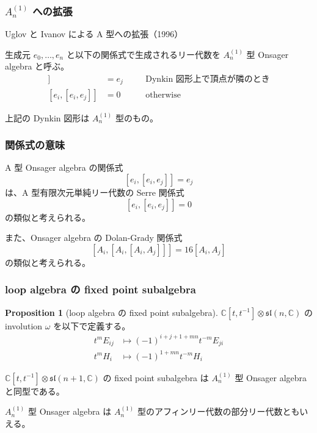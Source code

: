 \documentclass{beamer}
\theoremstyle{definition}
\newtheorem{proposition}{Proposition}
\begin{document}
\begin{frame}
    \frametitle{\(A_n^{(1)}\) への拡張}

    Uglov と Ivanov による A 型への拡張（1996）

    \begin{definition}
        生成元 \(e_0, \dots, e_n\) と以下の関係式で生成されるリー代数を \(A_n^{(1)}\) 型 Onsager algebra と呼ぶ。
        \begin{align*}
            [e_i, [e_i, e_j]] & = e_j & \quad & \text{Dynkin 図形上で頂点が隣のとき} \\
            [e_i, [e_i, e_j]] & = 0   & \quad & \text{otherwise}
        \end{align*}

        上記の Dynkin 図形は \(A_n^{(1)}\) 型のもの。

    \end{definition}
\end{frame}

\begin{frame}
    \frametitle{関係式の意味}

    A 型 Onsager algebra の関係式
    \[
        [e_i, [e_i, e_j]] = e_j
    \]
    は、A 型有限次元単純リー代数の Serre 関係式
    \[
        [e_i, [e_i, e_j]] = 0
    \]
    の類似と考えられる。

    また、Onsager algebra の Dolan-Grady 関係式
    \[
        [A_i, [A_i, [A_i, A_j]]] = 16[A_i, A_j]
    \]
    の類似と考えられる。
\end{frame}

\begin{frame}
    \frametitle{loop algebra の fixed point subalgebra}

    \begin{proposition}[loop algebra の fixed point subalgebra]
        \(\mathbb{C}[t,t^{-1}] \otimes \mathfrak{sl}(n,\mathbb{C})\) の
        involution \(\omega \) を以下で定義する。
        \begin{align*}
            t^m E_{ij} & \mapsto {(-1)}^{i+j+1+mn} t^{-m} E_{ji} \\
            t^m H_i    & \mapsto {(-1)}^{1+mn} t^{-m} H_i
        \end{align*}

        \(\mathbb{C}[t,t^{-1}] \otimes \mathfrak{sl}(n+1,\mathbb{C})\) の
        fixed point subalgebra は \(A_n^{(1)}\) 型 Onsager algebra と同型である。
    \end{proposition}

    \(A_n^{(1)}\) 型 Onsager algebra は \(A_n^{(1)}\) 型のアフィンリー代数の部分リー代数ともいえる。
\end{frame}
\end{document}
